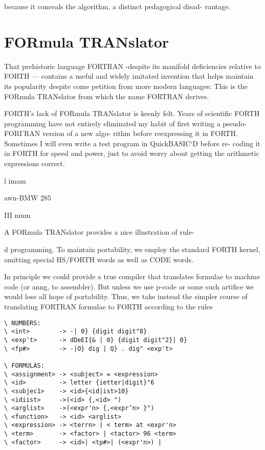 because it conceals the algorithm, a distinct pedagogical disad-
vantage.

\section{FORmula TRANslator}

That prehistoric language FORTRAN -despite its manifold
deficiencies relative to FORTH — contains a useful and widely
imitated invention that helps maintain its popularity despite come
petition from more modern languages: This is the FORmula
TRANslator from which the name FORTRAN derives.

FORTH’s lack of FORmula TRANslator is keenly felt. Years of
scientific FORTH programming have not entirely eliminated my
habit of first writing a pseudo-FORI'RAN version of a new algo-
rithm before reexpressing it in FORTH. Sometimes I will even
write a test program in QuickBASIC‘D before re- coding it in
FORTH for speed and power, just to avoid worry about getting
the arithmetic expressions correct.

l
imam

awn-BMW 285

III mum

A FORmula TRANslator provides a nice illustration of rule-

d programming. To maintain portability, we employ the
standard FORTH kernel, omitting special HS/FORTH words as
well as CODE words.

In principle we could provide a true compiler that translates
formulae to machine code (or anng, to assembler). But unless
we use p-code or some such artifice we would lose all hope of
portability. Thus, we take instead the simpler course of translating
FORTRAN formulae to FORTH according to the rules

\begin{verbatim}
\ NUMBERS:
\ <int>        -> -| 0} {digit digit"8}
\ <exp't>      -> dDeEI{& | 0} {digit digit"2}| 0}
\ <fp#>        -> -|O} dig | Q} . dig" <exp't>

\ FORMULAS:
\ <assignment> -> <subject> = <expression>
\ <id>         -> letter {ietter|digit}"6
\ <subjec1>    -> <id>{<id|ist>10}
\ <idiist>     ->(<id> {,<id> ")
\ <arglist>    ->(<expr'n> {,<expr’n> }")
\ <function>   -> <id> <arglist>
\ <expression> -> <terrn> | < term> at <expr'n>
\ <term>       -> <factor> | <tactor> 96 <term>
\ <factor>     -> <id>| <tp#>| (<expr'n>) |
\end{verbatim}

